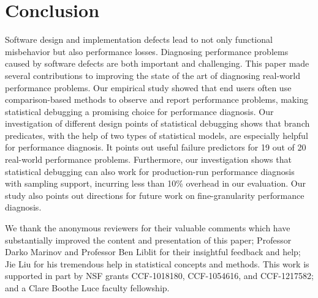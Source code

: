 \section{Conclusion}
\label{sec:con}
Software design and implementation defects lead to not only functional 
misbehavior but also performance losses. Diagnosing performance problems
caused by software defects are both important and challenging. This paper 
made several contributions to improving the state of the art of diagnosing
real-world performance problems. Our empirical study showed that end users
often use comparison-based methods to observe and report performance problems,
making statistical debugging a promising choice for performance diagnosis. 
Our investigation of different design points of statistical debugging shows
that branch predicates, with the help of two types of statistical models, are  
especially helpful for performance diagnosis. It points out useful failure
predictors for 19 out of 20 real-world performance problems. 
Furthermore, our investigation shows that statistical debugging can also
work for production-run performance diagnosis with sampling support, incurring 
less than 10\% overhead in our evaluation. Our study also points out
directions for future work on fine-granularity performance diagnosis.


\acks
We thank the anonymous reviewers for their valuable comments which have substantially improved the content and presentation of this paper; 
Professor Darko Marinov and Professor Ben Liblit for their insightful feedback and help; Jie Liu for his tremendous help in statistical concepts and methods.
This work is supported in part by NSF grants CCF-1018180,
CCF-1054616, and CCF-1217582; and a Clare Boothe Luce
faculty fellowship.
  
